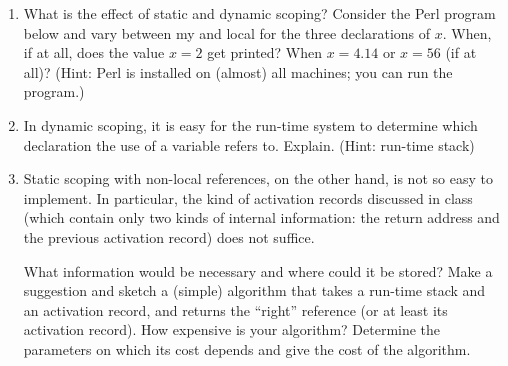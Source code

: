 \documentclass{article}
\begin{document}
\begin{enumerate}
\item What is the effect of static and dynamic scoping?
Consider the Perl program below and vary  between 
\textsf{my} and \textsf{local}
for the three
declarations of $x$. When, if at all, does the value $x=2$ get printed?
When $x=4.14$ or $x=56$ (if at all)? 
(Hint: Perl is installed on (almost) all machines; you can run
the program.)
\item In dynamic scoping, it is easy for the run-time system
to determine which declaration
the use of a variable refers to. Explain. (Hint: run-time
stack)
\item Static scoping with non-local references, on the other hand, is
  not so easy to implement. In particular, the kind of activation
  records discussed in class (which contain only two kinds of internal
  information: the return address and the previous activation record)
  does not suffice.
%

What information would be necessary and where could it be stored? 
Make a suggestion  and 
sketch a (simple) algorithm that takes a run-time stack and an activation record,
and returns the ``right'' reference (or at least its activation record).
How expensive is your algorithm? Determine the parameters on which its
cost depends and give the cost of the algorithm.
\end{enumerate}


\end{document}
